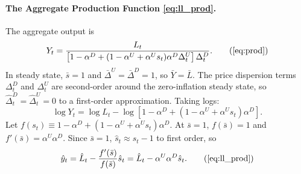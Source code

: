 \documentclass[a4paper, 12pt]{article}
\theoremstyle{definition*}
\begin{document}
\paragraph{The Aggregate Production Function \eqref{eq:ll_prod}.}
The aggregate output is
\begin{equation*}
    Y_t = \frac{L_t}{\left[1 - \alpha^D + (1 - \alpha^U + \alpha^U s_t)\alpha^D \Delta^U_t\right]\Delta^D_t}. \tag{\ref{eq:prod}}
\end{equation*}
In steady state, $\bar{s} = 1$ and $\bar{\Delta}^U = \bar{\Delta}^D = 1$, so $\bar{Y} = \bar{L}$.
The price dispersion terms $\Delta^D_t$ and $\Delta^U_t$ are second-order around the zero-inflation steady state, so $\hat{\Delta}^D_t = \hat{\Delta}^U_t = 0$ to a first-order approximation.
Taking logs:
\begin{equation*}
    \log Y_t = \log L_t - \log\left[1 - \alpha^D + (1 - \alpha^U + \alpha^U s_t)\alpha^D\right].
\end{equation*}
Let $f(s_t) \equiv 1 - \alpha^D + (1 - \alpha^U + \alpha^U s_t)\alpha^D$. At $\bar{s} = 1$, $f(\bar{s}) = 1$ and $f'(\bar{s}) = \alpha^U\alpha^D$. Since $\bar{s} = 1$, $\hat{s}_t \approx s_t - 1$ to first order, so
\begin{equation}
    \hat{y}_t = \hat{L}_t - \frac{f'(\bar{s})}{f(\bar{s})}\hat{s}_t = \hat{L}_t - \alpha^U\alpha^D\hat{s}_t. \tag{\ref{eq:ll_prod}}
\end{equation}
\end{document}
